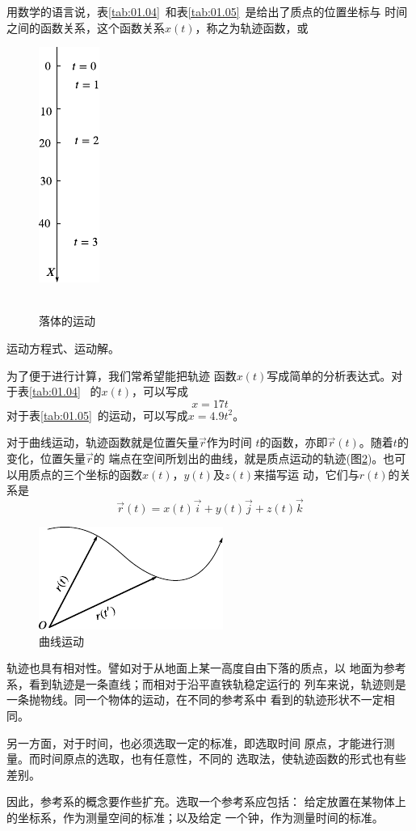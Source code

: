 用数学的语言说，表\ref{tab:01.04}~和表\ref{tab:01.05}~是给出了质点的位置坐标与
时间之间的函数关系，这个函数关系$x\left(t\right)$，称之为轨迹函数，或
\begin{figure}
 \centering
 \includegraphics{figure/fig01.08}
 \\ ~ \\
 \caption{落体的运动}
 \label{fig:01.08}
\end{figure}
运动方程式、运动解。

为了便于进行计算，我们常希望能把轨迹
函数$x\left(t\right)$写成简单的分析表达式。对于表\ref{tab:01.04}~
的$x\left(t\right)$，可以写成
\begin{equation}\label{eqn:01.05.01}
 x=17t
\end{equation}
对于表\ref{tab:01.05}~的运动，可以写成$x=4.9t^2$。

对于曲线运动，轨迹函数就是位置矢量$\vec{r}$作为时间
$t$的函数，亦即$\vec{r}\left(t\right)$。随着$t$的变化，位置矢量$\vec{r}$的
端点在空间所划出的曲线，就是质点运动的轨迹(图\ref{fig:01.09})。也可
以用质点的三个坐标的函数$x\left(t\right)$，$y\left(t\right)$及$z\left(t\right)$来描写运
动，它们与$r\left(t\right)$的关系是
\clearpage
\begin{equation}\label{eqn:01.05.02}
 \vec{r}\left(t\right)=x\left(t\right)\vec{i}+y\left(t\right)\vec{j}+z\left(t\right)\vec{k}
\end{equation}

\begin{figure}
 \centering
 \includegraphics{figure/fig01.09}
 \caption{曲线运动}
 \label{fig:01.09}
\end{figure}
轨迹也具有相对性。譬如对于从地面上某一高度自由下落的质点，以
地面为参考系，看到轨迹是一条直线；而相对于沿平直铁轨稳定运行的
列车来说，轨迹则是一条抛物线。同一个物体的运动，在不同的参考系中
看到的轨迹形状不一定相同。

另一方面，对于时间，也必须选取一定的标准，即选取时间
原点，才能进行测量。而时间原点的选取，也有任意性，不同的
选取法，使轨迹函数的形式也有些差别。

因此，参考系的概念要作些扩充。选取一个参考系应包括：
给定放置在某物体上的坐标系，作为测量空间的标准；以及给定
一个钟，作为测量时间的标准。